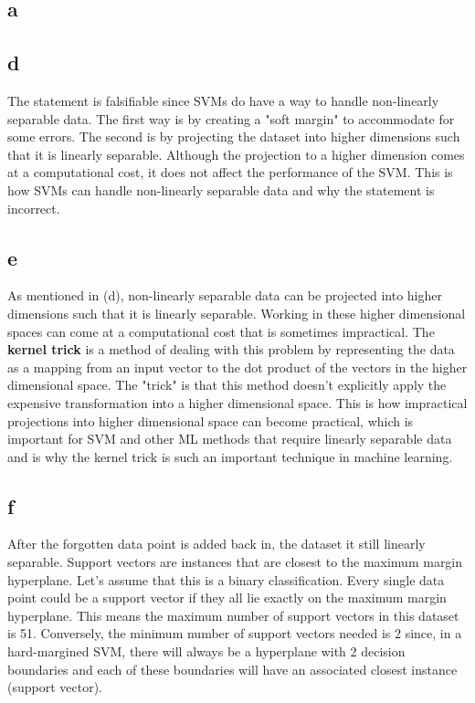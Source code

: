 \documentclass{article}
\begin{document}
\subsection*{a}

\subsection*{d}

The statement is falsifiable since SVMs do have a way to handle non-linearly separable data.
The first way is by creating a "soft margin" to accommodate for some errors. The second is by projecting
the dataset into higher dimensions such that it is linearly separable. Although the projection to 
a higher dimension comes at a computational cost, it does not affect the performance of the 
SVM. This is how SVMs can handle non-linearly separable data and why the statement 
is incorrect.

\subsection*{e}

As mentioned in (d), non-linearly separable data can be projected into higher dimensions such that it is 
linearly separable. Working in these higher dimensional spaces can come at a 
computational cost that is sometimes impractical. The \textbf{kernel trick} is a method of dealing
with this problem by representing the data as a mapping from an input vector 
to the dot product of the vectors in the higher dimensional space. The "trick" is that this method doesn't explicitly apply the 
expensive transformation into a higher dimensional space. This is how impractical projections into higher
dimensional space can become practical, which is important for SVM and other ML methods that 
require linearly separable data and is why the kernel trick is such an important technique in machine learning.

\subsection*{f}

After the forgotten data point is added back in, the dataset it still 
linearly separable. Support vectors are instances that are closest to the
maximum margin hyperplane. Let's assume that this is a binary classification. 
Every single data point could be a support vector if they all lie exactly on the 
maximum margin hyperplane. This means the maximum number of support vectors in this 
dataset is 51. Conversely, the minimum number of support vectors needed 
is 2 since, in a hard-margined SVM, there will always be a hyperplane with 2 
decision boundaries and each of these boundaries will have an associated closest
instance (support vector).
\end{document}
